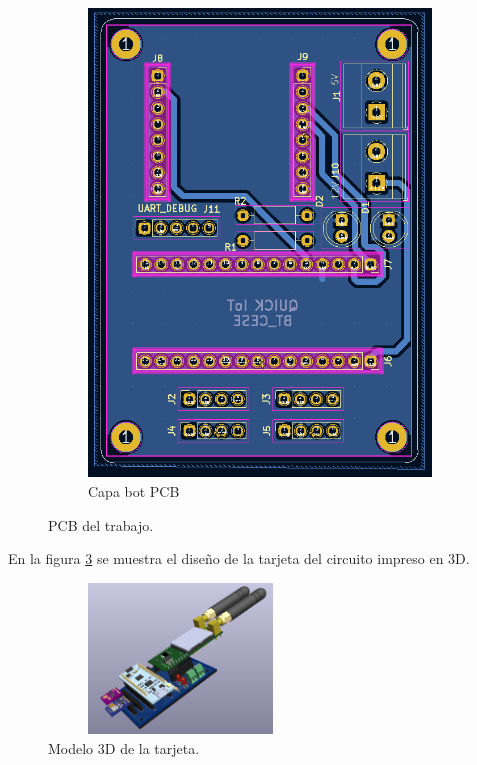 \begin{figure}[h!]
\begin{subfigure}[b]{0.27\linewidth}
  \includegraphics[width=\linewidth]{./Figures/pcb_bot.png}
  \caption{Capa bot PCB}
  \label{fig:Capa bot PCB}
  \end{subfigure}
  \caption{PCB del trabajo.}
  \label{fig:PCB del proyecto}
\end{figure}

En la figura \ref{fig:3D del modulo} se muestra el diseño de la tarjeta del circuito impreso en 3D.
\begin{figure}[h!]
  \centering
	\includegraphics[width=7cm, height=4cm]{./Figures/tarjeta3d.png}
  \caption{Modelo 3D de la tarjeta.}
	\label{fig:3D del modulo}
\end{figure}

